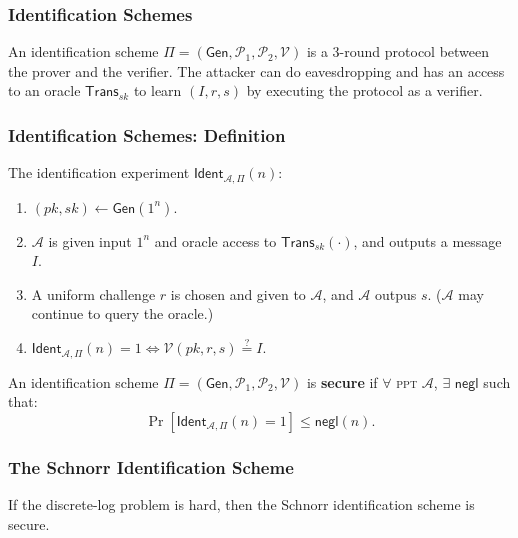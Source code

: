 \begin{frame}\frametitle{Identification Schemes}
An identification scheme $\Pi = (\mathsf{Gen}, \mathcal{P}_1, \mathcal{P}_2, \mathcal{V})$ is a 3-round protocol between the prover and the verifier. The attacker can do eavesdropping and has an access to an oracle $\mathsf{Trans}_{sk}$ to learn $(I, r, s)$ by executing the protocol as a verifier.
\begin{figure}
\begin{center}

\end{center}
\end{figure}
\end{frame}

\begin{frame}\frametitle{Identification Schemes: Definition}
The identification experiment $\mathsf{Ident}_{\mathcal{A},\Pi }(n)$:
\begin{enumerate}
\item $(pk,sk) \gets \mathsf{Gen}(1^n)$.
\item $\mathcal{A}$ is given input $1^n$ and oracle access to $\mathsf{Trans}_{sk}(\cdot)$, and outputs a message $I$.
\item A uniform challenge $r$ is chosen and given to $\mathcal{A}$, and $\mathcal{A}$ outpus $s$. ($\mathcal{A}$ may continue to query the oracle.)
\item $\mathsf{Ident}_{\mathcal{A},\Pi }(n) = 1 \iff \mathcal{V}(pk, r, s) \overset{?}{=} I$. 
\end{enumerate}
\begin{definition}
An identification scheme $\Pi = (\mathsf{Gen}, \mathcal{P}_1, \mathcal{P}_2, \mathcal{V})$ is \textbf{secure} if $\forall$ \textsc{ppt} $\mathcal{A}$, $\exists$ $\mathsf{negl}$ such that:
\[ \Pr [\mathsf{Ident}_{\mathcal{A},\Pi }(n) = 1] \le \mathsf{negl}(n).
\]
\end{definition}
\end{frame}

\begin{frame}\frametitle{The Schnorr Identification Scheme}
\begin{figure}
\begin{center}

\end{center}
\end{figure}
\begin{theorem}
If the discrete-log problem is hard, then the Schnorr identification scheme is secure.
\end{theorem}
\end{frame}

